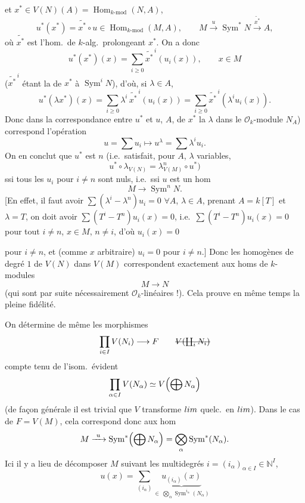 \documentclass[11pt,a4paper]{article}
\begin{document}
et $x^* \in V(N)(A) = \operatorname{Hom}_{k\text{-mod}}(N, A)$,
\[
  u^*(x^*) = \widetilde{x^*} \circ u \in \operatorname{Hom}_{k\text{-mod}}(M, A), \qquad M \xrightarrow{\ u\ } \operatorname{Sym}^* N \xrightarrow{\ \widetilde{x^*}\ } A,
\]
où $\widetilde{x^*}$ est l'hom.\ de $k$-alg.\ prolongeant $x^*$. On a donc
\[
  u^*(x^*)(x) = \sum_{i \geqslant 0} \widetilde{x^*}^{\,i}(u_i(x)), \qquad x \in M
\]
($\widetilde{x^*}^{\,i}$ étant la  de $x^*$ à $\operatorname{Sym}^i N$), d'où, si $\lambda \in A$,
\[
  u^*(\lambda x^*)(x) = \sum_{i \geqslant 0} \lambda^i\, \widetilde{x^*}^{\,i}(u_i(x)) = \sum_{i \geqslant 0} \widetilde{x^*}^{\,i}(\lambda^i u_i(x)).
\]
Donc dans la correspondance entre $u^*$ et $u$, \ill{} $A$, \ill{} de \ill{} $x^*$ \ill{} la   \struck{\ill{}} \ill{} $\lambda$ dans le $\mathcal{O}_k$-module \struck{\ill{}} \ill{} $N_A$) correspond l'opération
\[
  u = \sum u_i \longmapsto u^\lambda = \sum \lambda^i u_i .
\]
On en conclut que $u^*$ est  $n$ (i.e.\ satisfait, pour $A$, $\lambda$ variables,
\[
  u^* \circ \lambda_{V(N)} = \lambda^n_{V(M)} \circ u^* \text{)}
\]
ssi tous les $u_i$ pour $i \neq n$ sont nuls, i.e.\ ssi $u$ est un hom
\[
  M \longrightarrow \operatorname{Sym}^n N.
\]
[En effet, il faut avoir $\sum (\lambda^i - \lambda^n) u_i = 0$ $\forall A$, $\lambda \in A$, prenant $A = k[T]$ et $\lambda = T$, on doit avoir $\sum (T^i - T^n) u_i(x) = 0$, i.e.\ $\sum (T^i - T^n) u_i(x) = 0$ pour tout $i \neq n$, $x \in M$, $n \neq i$, d'où  $u_i(x) = 0$

pour $i \neq n$, et (comme $x$ arbitraire) $u_i = 0$ pour $i \neq n$.] Donc les \struck{\ill{}}  homogènes de degré $1$ de $V(N)$ dans $V(M)$ correspondent exactement aux homs de $k$-modules
\[
  M \longrightarrow N
\]
(qui sont par suite nécessairement $\mathcal{O}_k$-linéaires !). Cela prouve en même temps la pleine fidélité.

On détermine de même les morphismes
\[
  \prod_{i \in I} V(N_i) \longrightarrow F \qquad \text{\struck{$V(\textstyle\coprod_i N_i)$}}
\]
compte tenu de l'isom.\ évident
\[
  \prod_{\alpha \in I} V(N_\alpha) \simeq V\Bigl(\bigoplus N_\alpha\Bigr)
\]
(de façon générale il est trivial que $V$ transforme $\varinjlim$ quelc.\ en $\varprojlim$). Dans le cas de $F = V(M)$, cela correspond donc aux hom
\[
  M \xrightarrow{\ u\ } \operatorname{Sym}^*\Bigl(\bigoplus N_\alpha\Bigr) = \bigotimes_\alpha \operatorname{Sym}^*(N_\alpha).
\]
Ici il y a lieu de décomposer $M$ suivant les multidegrés $i = (i_\alpha)_{\alpha \in I} \in \mathbb{N}^I$,
\[
  u(x) = \sum_{(i_\alpha)} \underbrace{u_{(i_\alpha)}(x)}_{\in\, \bigotimes_\alpha \operatorname{Sym}^{i_\alpha}(N_\alpha)}
\]
\end{document}
